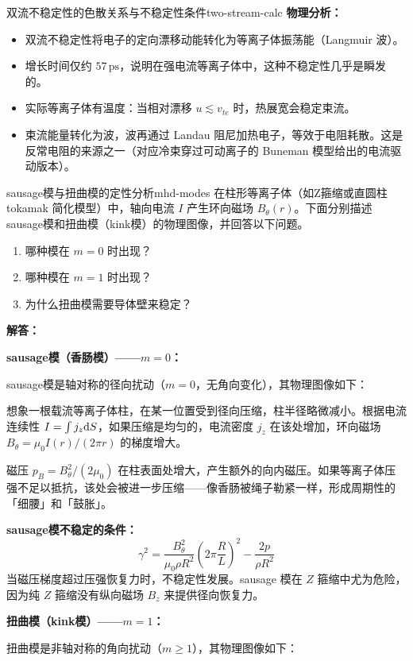 \begin{example}{双流不稳定性的色散关系与不稳定性条件}{two-stream-calc}
\textbf{物理分析：}
\begin{itemize}[leftmargin=*,itemsep=0pt]
\item 双流不稳定性将电子的定向漂移动能转化为等离子体振荡能（Langmuir 波）。
\item 增长时间仅约 $57\,\mathrm{ps}$，说明在强电流等离子体中，这种不稳定性几乎是瞬发的。
\item 实际等离子体有温度：当相对漂移 $u\lesssim v_{te}$ 时，热展宽会稳定束流。
\item 束流能量转化为波，波再通过 Landau 阻尼加热电子，等效于电阻耗散。这是反常电阻的来源之一（对应冷束穿过可动离子的 Buneman 模型给出的电流驱动版本）。
\end{itemize}
\end{example}

\begin{example}{sausage模与扭曲模的定性分析}{mhd-modes}
在柱形等离子体（如Z箍缩或直圆柱 tokamak 简化模型）中，轴向电流 $I$ 产生环向磁场 $B_\theta(r)$。下面分别描述 sausage模和扭曲模（kink模）的物理图像，并回答以下问题。
\begin{enumerate}[label=(\arabic*)]
\item 哪种模在 $m=0$ 时出现？
\item 哪种模在 $m=1$ 时出现？
\item 为什么扭曲模需要导体壁来稳定？
\end{enumerate}
\tcblower
\textbf{解答：}

\textbf{sausage模（香肠模）——$m=0$：}

 sausage模是轴对称的径向扰动（$m=0$，无角向变化），其物理图像如下：

想象一根载流等离子体柱，在某一位置受到径向压缩，柱半径略微减小。根据电流连续性 $I = \int j_z \mathrm{d} S$，如果压缩是均匀的，电流密度 $j_z$ 在该处增加，环向磁场 $B_\theta = \mu_0 I(r)/(2\pi r)$ 的梯度增大。

磁压 $p_B = B_\theta^2/(2\mu_0)$ 在柱表面处增大，产生额外的向内磁压。如果等离子体压强不足以抵抗，该处会被进一步压缩——像香肠被绳子勒紧一样，形成周期性的「细腰」和「鼓胀」。

\textbf{ sausage模不稳定的条件：}
\[
\gamma^2 = \frac{B_\theta^2}{\mu_0\rho R^2}\left(2\pi\frac{R}{L}\right)^2 - \frac{2p}{\rho R^2}
\]
当磁压梯度超过压强恢复力时，不稳定性发展。sausage 模在 $Z$ 箍缩中尤为危险，因为纯 $Z$ 箍缩没有纵向磁场 $B_z$ 来提供径向恢复力。

\textbf{扭曲模（kink模）——$m=1$：}

扭曲模是非轴对称的角向扰动（$m \geq 1$），其物理图像如下：


\end{example}
